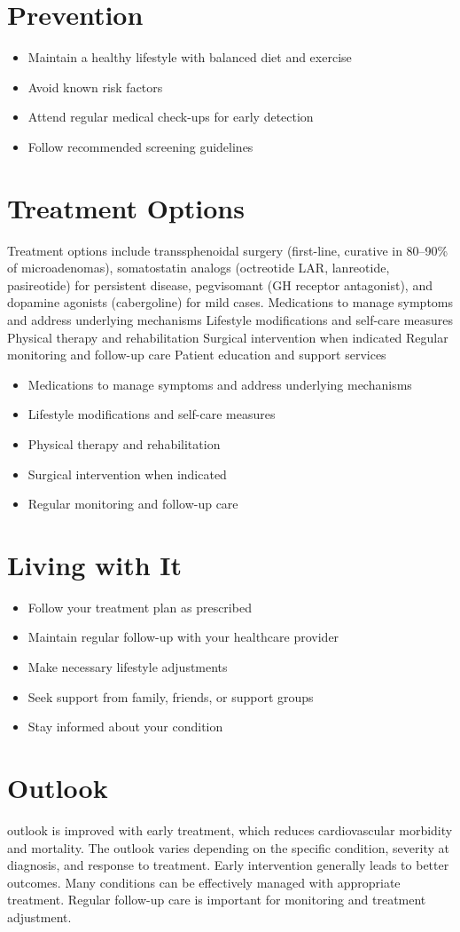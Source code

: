 \section{Prevention}
\begin{itemize}[noitemsep]
  \item Maintain a healthy lifestyle with balanced diet and exercise
  \item Avoid known risk factors
  \item Attend regular medical check-ups for early detection
  \item Follow recommended screening guidelines
\end{itemize}
\section{Treatment Options}
Treatment options include transsphenoidal surgery (first-line, curative in 80--90\% of microadenomas), somatostatin analogs (octreotide LAR, lanreotide, pasireotide) for persistent disease, pegvisomant (GH receptor antagonist), and dopamine agonists (cabergoline) for mild cases. Medications to manage symptoms and address underlying mechanisms Lifestyle modifications and self-care measures Physical therapy and rehabilitation Surgical intervention when indicated Regular monitoring and follow-up care Patient education and support services

\begin{itemize}[noitemsep]
  \item Medications to manage symptoms and address underlying mechanisms
  \item Lifestyle modifications and self-care measures
  \item Physical therapy and rehabilitation
  \item Surgical intervention when indicated
  \item Regular monitoring and follow-up care
\end{itemize}
\section{Living with It}
\begin{itemize}[noitemsep]
  \item Follow your treatment plan as prescribed
  \item Maintain regular follow-up with your healthcare provider
  \item Make necessary lifestyle adjustments
  \item Seek support from family, friends, or support groups
  \item Stay informed about your condition
\end{itemize}
\section{Outlook}
outlook is improved with early treatment, which reduces cardiovascular morbidity and mortality. The outlook varies depending on the specific condition, severity at diagnosis, and response to treatment. Early intervention generally leads to better outcomes. Many conditions can be effectively managed with appropriate treatment. Regular follow-up care is important for monitoring and treatment adjustment.
